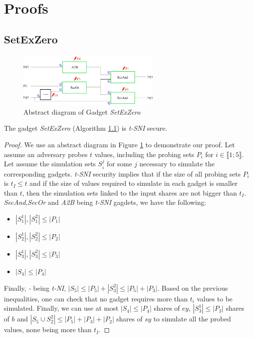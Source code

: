 \documentclass[runningheads]{llncs}
\begin{document}
\section{Proofs}
\subsection{SetExZero}
\label{alg:setexzero}
\begin{figure}[!ht]
    \centering
    \includegraphics[width=7cm]{figure/SetExZero.pdf}
    \caption{Abstract diagram of Gadget \emph{SetExZero}}
    \label{fig:setexzero}
\end{figure}
\begin{lemma}\label{lem:setexzero}
    The gadget \emph{SetExZero} (Algorithm \ref{alg:setexzero}) is \emph{t-SNI} secure.    
\end{lemma}
\begin{proof}\label{proof:setexzero}
    We use an abstract diagram in Figure \ref{fig:setexzero} to demonstrate our proof. Let assume an adversary probes $t$ values, including the probing sets $P_i$ for $i\in\llbracket 1;5\rrbracket$. Let assume the simulation sets $S_i^j$ for some $j$ necessary to simulate the corresponding gadgets. \emph{t-SNI} security implies that if the size of all probing sets $P_i$ is $t_I\leq t$ and if the size of values required to simulate in each gadget is smaller than $t$, then the simulation sets linked to the input shares are not bigger than $t_I$.\newline
    \emph{SecAnd},\emph{SecOr} and \emph{A2B} being \emph{t-SNI} gagdets, we have the following:
    \begin{multicols}{2}
        \begin{itemize}
            \item $|S_1^1|,|S_1^2|\leq|P_1|$
            \item $|S_2^1|,|S_2^2|\leq|P_2|$
            \item $|S_3^1|,|S_3^2|\leq|P_3|$
            \item $|S_4|\leq|P_4|$
        \end{itemize}
    \end{multicols}
    Finally, \emph{-} being \emph{t-NI}, $|S_5|\leq|P_5|+|S_3^2|\leq|P_5|+|P_3|$. Based on the previous inequalities, one can check that no gadget requires more than $t_i$ values to be simulated. Finally, we can use at most $|S_4|\leq|P_4|$ shares of $ey$, $|S_3^1|\leq|P_3|$ shares of $b$ and $|S_5 \cup S_2^2| \leq |P_5| + |P_3| + |P_2|$ shares of $sy$ to simulate all the probed values, none being more than $t_I$.
\end{proof}
\end{document}
